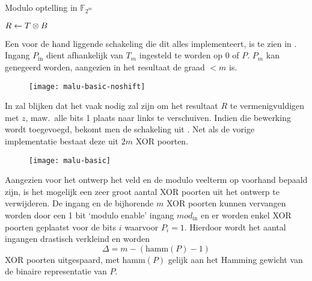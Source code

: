 \begin{algorithm}[h]
\dontprintsemicolon
\caption{Modulo optelling in $\mathbb{F}_{2^m}$}
\label{algoritme-implementatie-malu-modulo}

$R \leftarrow T \otimes B$\;

\end{algorithm}

Een voor de hand liggende schakeling die dit alles implementeert, is te zien in . Ingang $P_{\text{in}}$ dient afhankelijk van $T_{m}$ ingesteld te worden op $0$ of $P$. $P_{m}$ kan genegeerd worden, aangezien in het resultaat de graad $< m$ is.

\begin{figure}[h]
	\begin{center}
		\texttt{[image: malu-basic-noshift]}
		\label{figuur-implementatie-malu-basic-noshift}
	\end{center}
\end{figure}

In  zal blijken dat het vaak nodig zal zijn om het resultaat $R$ te vermenigvuldigen met $z$, maw.\ alle bits 1 plaats naar links te verschuiven. Indien die bewerking wordt toegevoegd, bekomt men de schakeling uit . Net als de vorige implementatie bestaat deze uit $2m$ XOR poorten.

\begin{figure}[h]
	\begin{center}
		\texttt{[image: malu-basic]}
		\label{figuur-implementatie-malu-basic}
	\end{center}
\end{figure}

Aangezien voor het ontwerp het veld en de modulo veelterm op voorhand bepaald zijn, is het mogelijk een zeer groot aantal XOR poorten uit het ontwerp te verwijderen. De ingang en de bijhorende $m$ XOR poorten kunnen vervangen worden door een 1 bit `modulo enable' ingang $mod_{\text{in}}$ en er worden enkel XOR poorten geplaatst voor de bits $i$ waarvoor $P_i = 1$. Hierdoor wordt het aantal ingangen drastisch verkleind en worden 
\[\Delta = m - (\text{hamm}(P) - 1)\]
XOR poorten uitgespaard, met hamm$(P)$ gelijk aan het Hamming gewicht van de binaire representatie van $P$.

